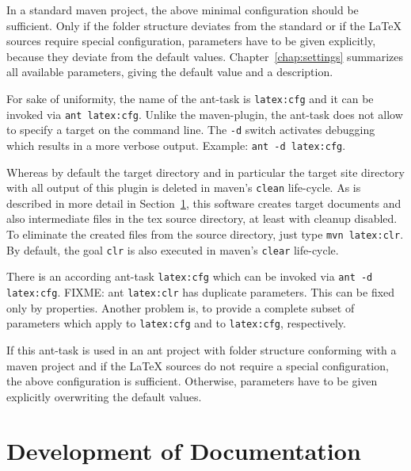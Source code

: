 In a standard maven project, 
the above minimal configuration should be sufficient. 
Only if the folder structure deviates from the standard 
or if the \LaTeX{} sources require special configuration, 
parameters have to be given explicitly, 
because they deviate from the default values. 
Chapter~\ref{chap:settings} summarizes all available parameters, 
giving the default value and a description. 


For sake of uniformity, 
the name of the ant-task is \texttt{latex:cfg} 
and it can be invoked via \texttt{ant latex:cfg}. 
Unlike the maven-plugin, the ant-task 
does not allow to specify a target on the command line. 
The \texttt{-d} switch activates debugging 
which results in a more verbose output. 
Example: \texttt{ant -d latex:cfg}. 

Whereas by default the target directory and in particular 
the target site directory with all output of this plugin is deleted 
in maven's \texttt{clean} life-cycle. 
As is described in more detail in Section~\ref{sec:devel}, 
this software creates target documents and also intermediate files 
in the tex source directory, at least with cleanup disabled. 
To eliminate the created files from the source directory, 
just type \texttt{mvn latex:clr}. 
By default, the goal \texttt{clr} 
is also executed in maven's \texttt{clear} life-cycle. 

There is an according ant-task \texttt{latex:cfg} 
which can be invoked via \texttt{ant -d latex:cfg}. 
FIXME\@: ant  \texttt{latex:clr} has duplicate parameters. 
This can be fixed only by properties. 
Another problem is, to provide a complete subset of parameters 
which apply to \texttt{latex:cfg} and to \texttt{latex:cfg}, respectively. 

If this ant-task is used in an ant project 
with folder structure conforming with a maven project 
and if the \LaTeX{} sources do not require a special configuration, 
the above configuration is sufficient. 
Otherwise, parameters have to be given explicitly 
overwriting the default values. 

\section{Development of Documentation}\label{sec:devel}

